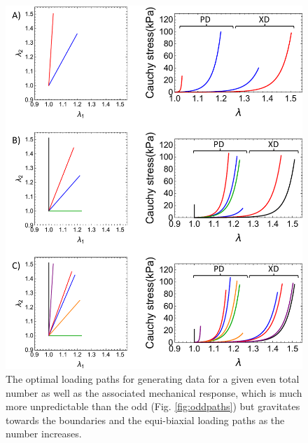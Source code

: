 \begin{figure}
\centering
\includegraphics[width=5.5in]{Images/chapter5/evenpaths}
\caption{The optimal loading paths for generating data for a given even total number as well as the associated mechanical response, which is much more unpredictable than the odd (Fig. \ref{fig:oddpaths}) but gravitates towards the boundaries and the equi-biaxial loading paths as the number increases.}
\label{fig:evenpaths}
\end{figure} 
